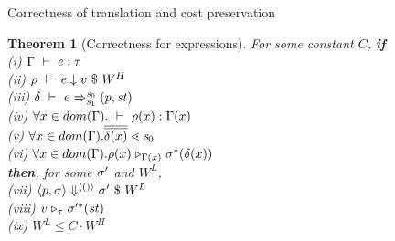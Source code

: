 \documentclass{beamer}
\newtheorem{thm}{Theorem}
\newtheorem{lem}[thm]{Lemma}
\begin{document}
\begin{frame}{Correctness of translation and cost preservation }
%		
%		

\begin{thm}[Correctness for expressions]
	For some constant $C$, \textbf{if} \\
    (i) $\Gamma \ \vdash\  e : \tau$ \\
    (ii) $\rho \ \vdash\  e \downarrow v \ \$ \ W^H$ \\ 
	(iii) $\delta \ \vdash\  e \Rightarrow^{\mathit{s}_0}_{\mathit{s}_1} (p,\mathit{st})$ \\ 
	(iv) $\forall x \in dom(\Gamma). \ \vdash\  \rho(x) : \Gamma(x)$ \\ 
	(v) $\forall x \in dom(\Gam). \olol{\del(x)} \.< \s_0$ \\
	(vi) $\forall x \in dom(\Gamma).  \rho(x) \mathrel{\triangleright_{\Gamma(x)}} \sigma^*(\delta(x))$ \\
	\textbf{then}, for some $\sigma'$ and $W^L$, \\
	(vii) $\left\langle p,\sigma \right\rangle \Downarrow^{\langle () \rangle} \sigma' \ \$ \ W^L$ \\
    (viii)  $v \mathrel{\triangleright_{\tau}} \sigma'^*(\mathit{st})$ \\
	(ix) $W^L \le C \cdot W^H$  \\
	\end{thm}

\end{frame}
\end{document}
